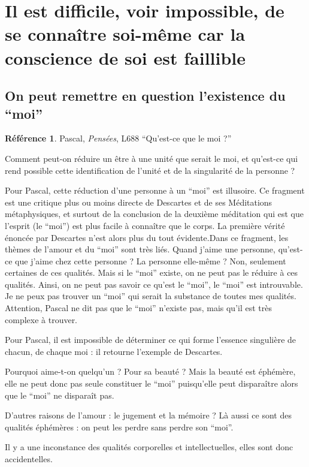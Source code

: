 \documentclass[french]{book}
\theoremstyle{definition}
\newtheorem*{refe}{Référence}
\begin{document}
\section{Il est difficile, voir impossible, de se connaître soi-même car la conscience de soi est faillible}

\subsection{On peut remettre en question l’existence du “moi”}

\begin{refe}
	Pascal, \textit{Pensées}, L688 “Qu’est-ce que le moi ?”
\end{refe}

Comment peut-on réduire un être à une unité que serait le moi, et qu’est-ce qui rend possible cette identification de l’unité et de la singularité de la personne ?

Pour Pascal, cette réduction d’une personne à un “moi” est illusoire. Ce fragment est une critique plus ou moins directe de Descartes et de ses Méditations métaphysiques, et surtout de la conclusion de la deuxième méditation qui est que l’esprit (le “moi”) est plus facile à connaître que le corps. La première vérité énoncée par Descartes n’est alors plus du tout évidente.Dans ce fragment, les thèmes de l’amour et du “moi” sont très liés. Quand j’aime une personne, qu’est-ce que j’aime chez cette personne ? La personne elle-même ? Non, seulement certaines de ces qualités. Mais si le “moi” existe, on ne peut pas le réduire à ces qualités.
Ainsi, on ne peut pas savoir ce qu’est le “moi”, le “moi” est introuvable. Je ne peux pas trouver un “moi” qui serait la substance de toutes mes qualités. Attention, Pascal ne dit pas que le “moi” n’existe pas, mais qu’il est très complexe à trouver.

Pour Pascal, il est impossible de déterminer ce qui forme l’essence singulière de chacun, de chaque moi : il retourne l’exemple de Descartes.

Pourquoi aime-t-on quelqu’un ? Pour sa beauté ? Mais la beauté est éphémère, elle ne peut donc pas seule constituer le “moi” puisqu’elle peut disparaître alors que le “moi” ne disparaît pas.

D’autres raisons de l’amour : le jugement et la mémoire ? Là aussi ce sont des qualités éphémères : on peut les perdre sans perdre son “moi”. 

Il y a une inconstance des qualités corporelles et intellectuelles, elles sont donc accidentelles.
\end{document}
